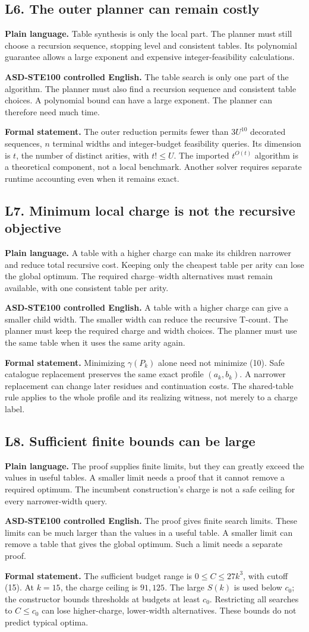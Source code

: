 \documentclass[11pt,letterpaper]{article}
\newcommand{\Plain}[1]{\par\textbf{\color{navy}Plain language.} #1\par}
\newcommand{\STE}[1]{\par\textbf{\color{teal}ASD-STE100 controlled English.} #1\par}
\newcommand{\Formal}[1]{\par\textbf{Formal statement.} #1\par}
\begin{document}
\subsection{L6. The outer planner can remain costly}
\Plain{Table synthesis is only the local part. The planner must still
choose a recursion sequence, stopping level and consistent tables.
Its polynomial guarantee allows a large exponent and expensive
integer-feasibility calculations.}
\STE{The table search is only one part of the algorithm. The planner must also find a recursion sequence and consistent table choices. A polynomial bound can have a large exponent. The planner can therefore need much time.}
\Formal{The outer reduction permits fewer than \(3U^{10}\)
decorated sequences, \(n\) terminal widths and integer-budget
feasibility queries. Its dimension is \(t\), the number of distinct
arities, with \(t!\le U\). The imported \(t^{O(t)}\) algorithm is
a theoretical component, not a local benchmark. Another solver
requires separate runtime accounting even when it remains exact.}

\clearpage
\subsection{L7. Minimum local charge is not the recursive objective}
\Plain{A table with a higher charge can make its children narrower
and reduce total recursive cost. Keeping only the cheapest table
per arity can lose the global optimum. The required charge--width
alternatives must remain available, with one consistent table per arity.}
\STE{A table with a higher charge can give a smaller child width. The smaller width can reduce the recursive T-count. The planner must keep the required charge and width choices. The planner must use the same table when it uses the same arity again.}
\Formal{Minimizing \(\gamma(P_k)\) alone need not minimize (10).
Safe catalogue replacement preserves the same exact profile
\((a_k,b_k)\). A narrower replacement can change later residues
and continuation costs. The shared-table rule applies to the whole
profile and its realizing witness, not merely to a charge label.}

\subsection{L8. Sufficient finite bounds can be large}
\Plain{The proof supplies finite limits, but they can greatly exceed
the values in useful tables. A smaller limit needs a proof that it
cannot remove a required optimum. The incumbent construction's
charge is not a safe ceiling for every narrower-width query.}
\STE{The proof gives finite search limits. These limits can be much larger than the values in a useful table. A smaller limit can remove a table that gives the global optimum. Such a limit needs a separate proof.}
\Formal{The sufficient budget range is \(0\le C\le27k^3\), with
cutoff (15). At \(k=15\), the charge ceiling is \(91{,}125\).
The large \(S(k)\) is used below \(c_0\); the constructor bounds
thresholds at budgets at least \(c_0\).
Restricting all searches to \(C\le c_0\) can lose higher-charge,
lower-width alternatives. These bounds do not predict typical optima.}
\end{document}
